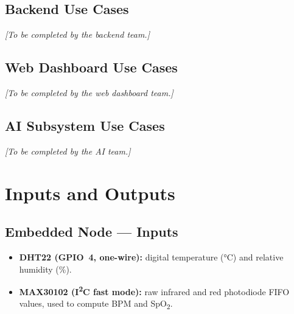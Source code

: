 \subsection*{Backend Use Cases}
\begin{center}
	\textit{[To be completed by the backend team.]}
\end{center}

\subsection*{Web Dashboard Use Cases}
\begin{center}
	\textit{[To be completed by the web dashboard team.]}
\end{center}

\subsection*{AI Subsystem Use Cases}
\begin{center}
	\textit{[To be completed by the AI team.]}
\end{center}

\section{Inputs and Outputs}

\subsection*{Embedded Node — Inputs}

\begin{itemize}
	\item \textbf{DHT22 (GPIO~4, one-wire):} digital temperature (°C) and relative
	      humidity (\%).
	\item \textbf{MAX30102 (I\textsuperscript{2}C fast mode):} raw infrared
	      and red photodiode FIFO values, used to compute BPM and SpO\textsubscript{2}.
\end{itemize}

